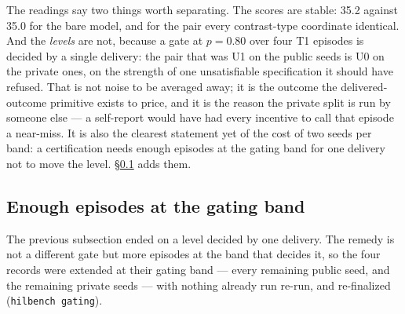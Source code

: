 The readings say two things worth separating. The scores are stable: 35.2 against 35.0 for the bare model, and for the pair every contrast-type coordinate identical. And the \emph{levels} are not, because a gate at $p = 0.80$ over four T1 episodes is decided by a single delivery: the pair that was U1 on the public seeds is U0 on the private ones, on the strength of one unsatisfiable specification it should have refused. That is not noise to be averaged away; it is the outcome the delivered-outcome primitive exists to price, and it is the reason the private split is run by someone else --- a self-report would have had every incentive to call that episode a near-miss. It is also the clearest statement yet of the cost of two seeds per band: a certification needs enough episodes at the gating band for one delivery not to move the level. \S\ref{sec:gating} adds them.

\subsection{Enough episodes at the gating band}\label{sec:gating}

The previous subsection ended on a level decided by one delivery. The remedy is not a different gate but more episodes at the band that decides it, so the four records were extended at their gating band --- every remaining public seed, and the remaining private seeds --- with nothing already run re-run, and re-finalized (\texttt{hilbench gating}).


